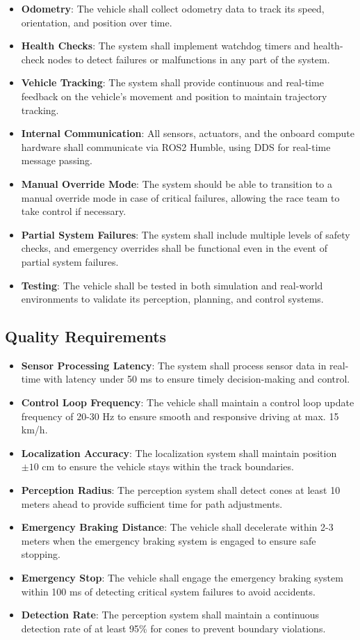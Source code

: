 \begin{itemize}
    \item \textbf{Odometry}: The vehicle shall collect odometry data to track its speed, orientation, and position over time.
    \item \textbf{Health Checks}: The system shall implement watchdog timers and health-check nodes to detect failures or malfunctions in any part of the system.
    \item \textbf{Vehicle Tracking}: The system shall provide continuous and real-time feedback on the vehicle's movement and position to maintain trajectory tracking.
    \item \textbf{Internal Communication}: All sensors, actuators, and the onboard compute hardware shall communicate via ROS2 Humble, using DDS for real-time message passing.
    \item \textbf{Manual Override Mode}: The system should be able to transition to a manual override mode in case of critical failures, allowing the race team to take control if necessary.
    \item \textbf{Partial System Failures}: The system shall include multiple levels of safety checks, and emergency overrides shall be functional even in the event of partial system failures.
    \item \textbf{Testing}: The vehicle shall be tested in both simulation and real-world environments to validate its perception, planning, and control systems.
\end{itemize}

\subsection{Quality Requirements}

\begin{itemize}
    \item \textbf{Sensor Processing Latency}: The system shall process sensor data in real-time with latency under 50 ms to ensure timely decision-making and control.
    \item \textbf{Control Loop Frequency}: The vehicle shall maintain a control loop update frequency of 20-30 Hz to ensure smooth and responsive driving at max. 15 km/h.
    \item \textbf{Localization Accuracy}: The localization system shall maintain position \(\pm 10\) cm to ensure the vehicle stays within the track boundaries.
    \item \textbf{Perception Radius}: The perception system shall detect cones at least 10 meters ahead to provide sufficient time for path adjustments.
    \item \textbf{Emergency Braking Distance}: The vehicle shall decelerate within 2-3 meters when the emergency braking system is engaged to ensure safe stopping.
    \item \textbf{Emergency Stop}: The vehicle shall engage the emergency braking system within 100 ms of detecting critical system failures to avoid accidents.
    \item \textbf{Detection Rate}: The perception system shall maintain a continuous detection rate of at least 95\% for cones to prevent boundary violations.
\end{itemize}

